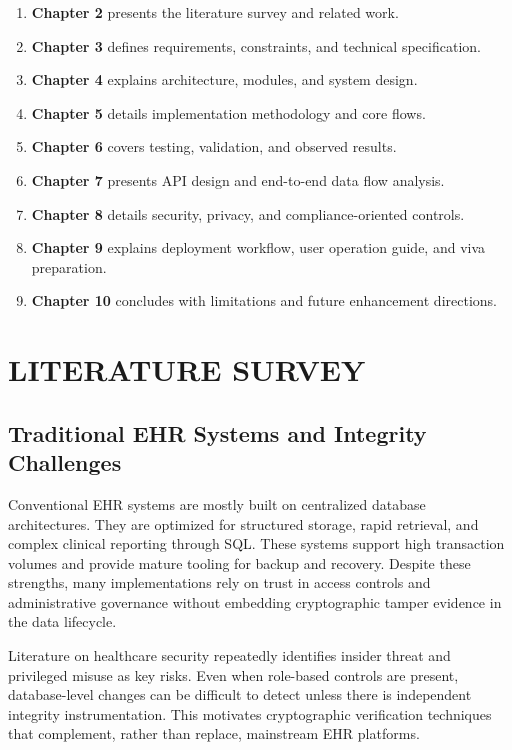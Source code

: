 \documentclass[12pt,a4paper]{report}
\begin{document}
\begin{enumerate}
\item \textbf{Chapter 2} presents the literature survey and related work.
\item \textbf{Chapter 3} defines requirements, constraints, and technical specification.
\item \textbf{Chapter 4} explains architecture, modules, and system design.
\item \textbf{Chapter 5} details implementation methodology and core flows.
\item \textbf{Chapter 6} covers testing, validation, and observed results.
\item \textbf{Chapter 7} presents API design and end-to-end data flow analysis.
\item \textbf{Chapter 8} details security, privacy, and compliance-oriented controls.
\item \textbf{Chapter 9} explains deployment workflow, user operation guide, and viva preparation.
\item \textbf{Chapter 10} concludes with limitations and future enhancement directions.
\end{enumerate}

\chapter{LITERATURE SURVEY}

\section{Traditional EHR Systems and Integrity Challenges}

Conventional EHR systems are mostly built on centralized database architectures. They are optimized for structured storage, rapid retrieval, and complex clinical reporting through SQL. These systems support high transaction volumes and provide mature tooling for backup and recovery. Despite these strengths, many implementations rely on trust in access controls and administrative governance without embedding cryptographic tamper evidence in the data lifecycle.

Literature on healthcare security repeatedly identifies insider threat and privileged misuse as key risks. Even when role-based controls are present, database-level changes can be difficult to detect unless there is independent integrity instrumentation. This motivates cryptographic verification techniques that complement, rather than replace, mainstream EHR platforms.
\end{document}
